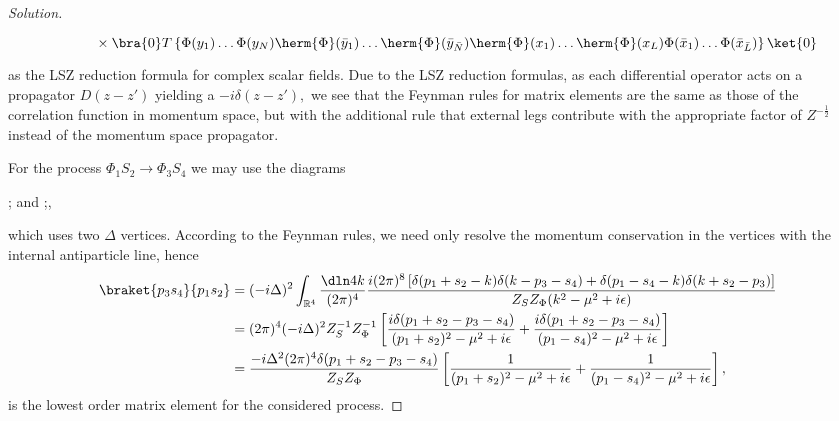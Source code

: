 \begin{proof}[Solution]
\begin{align*}
                                         &{}\phantom{\left(iZ_\Phi^{-\frac12}\right)}\times \bra{0}T\left\{\Phi(y_1) \dots \Phi(y_N) \herm{\Phi}(\bar{y}_1) \dots \herm{\Phi}(\bar{y}_{\bar{N}}) \herm{\Phi}(x_1) \dots \herm{\Phi}(x_L) \Phi(\bar{x}_1) \dots \Phi(\bar{x}_{\bar{L}})\right\}\ket{0}
   \end{align*}
   as the LSZ reduction formula for complex scalar fields. Due to the LSZ reduction formulas, as each differential operator acts on a propagator \(D(z - z')\) yielding a \(-i \delta(z - z'),\) we see that the Feynman rules for matrix elements are the same as those of the correlation function in momentum space, but with the additional rule that external legs contribute with the appropriate factor of \(Z^{-\frac12}\) instead of the momentum space propagator.

   For the process \(\Phi_1 S_2 \to \Phi_3 S_4\) we may use the diagrams
   \begin{center}
      ; 
      \quad and \quad
      ;,
   \end{center}
   which uses two \(\Delta\) vertices. According to the Feynman rules, we need only resolve the momentum conservation in the vertices with the internal antiparticle line, hence
   \begin{align*}
      \braket{p_3 s_4}{p_1 s_2} &= (-i \Delta)^2 \int_{\mathbb{R}^4}\frac{\dln4k}{(2\pi)^4} \frac{i (2\pi)^8 \left[\delta(p_1 + s_2 - k)\delta(k - p_3 - s_4) + \delta(p_1 - s_4 - k)\delta(k + s_2 - p_3)\right]}{Z_S Z_\Phi (k^2 - \mu^2 + i \epsilon)}\\
      &= (2\pi)^4(-i \Delta)^2 Z_S^{-1} Z_\Phi^{-1} \left[\frac{i \delta(p_1 + s_2 - p_3 - s_4)}{(p_1 + s_2)^2 - \mu^2 + i \epsilon} + \frac{i \delta(p_1 + s_2 - p_3 - s_4)}{(p_1 - s_4)^2 - \mu^2 + i \epsilon}\right]\\
                                &= \frac{-i \Delta^2 (2\pi)^4 \delta(p_1 + s_2 - p_3 - s_4)}{Z_S Z_\Phi}\left[\frac{1}{(p_1 + s_2)^2 - \mu^2 + i \epsilon} + \frac{1}{(p_1 - s_4)^2 - \mu^2 + i \epsilon}\right],
   \end{align*}
   is the lowest order matrix element for the considered process. 


\end{proof}
